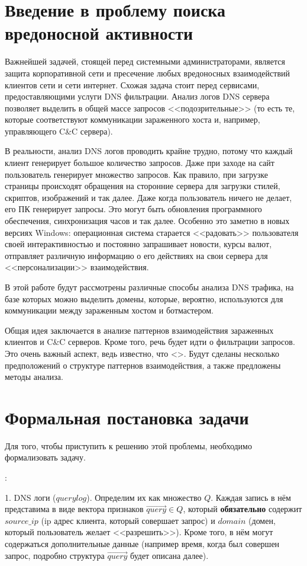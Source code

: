 \documentclass[14pt]{extreport} %
\begin{document}
\newpage
\chapter{Введение в проблему поиска вредоносной активности}

Важнейшей задачей, стоящей перед системными администраторами, является защита корпоративной сети и пресечение любых вредоносных взаимодействий клиентов сети и сети интернет. Схожая задача стоит перед сервисами, предоставляющими услуги DNS фильтрации. Анализ логов DNS сервера позволяет выделить в общей массе запросов <<подозрительные>> (то есть те, которые соответствуют коммуникации зараженного хоста и, например, управляющего C\&C сервера). 

В реальности, анализ DNS логов проводить крайне трудно, потому что каждый клиент генерирует большое количество запросов. Даже при заходе на сайт пользователь генерирует множество запросов. Как правило, при загрузке страницы происходят обращения на сторонние сервера для загрузки стилей, скриптов, изображений и так далее. Даже когда пользователь ничего не делает, его ПК генерирует запросы. Это могут быть обновления программного обеспечения, синхронизация часов и так далее. Особенно это заметно в новых версиях Windows: операционная система старается <<радовать>> пользователя своей интерактивностью и постоянно запрашивает новости, курсы валют, отправляет различную информацию о его действиях на свои сервера для <<персонализации>> взаимодействия.

В этой работе будут рассмотрены различные способы анализа DNS трафика, на базе которых можно выделить домены, которые, вероятно, используются для коммуникации между зараженным хостом и ботмастером.

\newpage
Общая идея заключается в анализе паттернов взаимодействия зараженных клиентов и C\&C серверов. Кроме того, речь будет идти о фильтрации запросов. Это очень важный аспект, ведь известно, что <>. Будут сделаны несколько предположений о структуре паттернов взаимодействия, а также предложены методы анализа.

\chapter{Формальная постановка задачи}
Для того, чтобы приступить к решению этой проблемы, необходимо формализовать задачу.
	
{:}
		
1. DNS логи ($querylog$). Определим их как множество $Q$. Каждая запись в нём представима в виде вектора признаков $\vec{query}$$\in$$Q$, который \textbf{обязательно} содержит $source\_ip$ (ip адрес клиента, который совершает запрос) и $domain$ (домен, который пользователь желает <<разрешить>>). Кроме того, в нём могут содержаться дополнительные данные (например время, когда был совершен запрос, подробно структура $\vec{query}$ будет описана далее).
		
\end{document}

